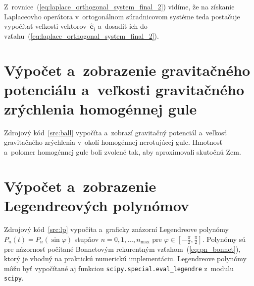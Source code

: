 \documentclass[a4paper, 12pt]{book}
\let\vec\mathbf
\begin{document}
Z~rovnice~(\ref{eq:laplace_orthogonal_system_final_2}) vidíme, že na získanie 
Laplaceovho operátora v~ortogonálnom súradnicovom systéme teda postačuje 
vypočítať veľkosti vektorov~$\hat{\vec e}_i$ a~dosadiť ich do 
vzťahu~(\ref{eq:laplace_orthogonal_system_final_2}).




\chapter{Výpočet a~zobrazenie gravitačného potenciálu a~veľkosti gravitačného 
zrýchlenia homogénnej gule}
\label{app:ball}

Zdrojový kód~\ref{src:ball} vypočíta a~zobrazí gravitačný potenciál a~veľkosť 
gravitačného zrýchlenia v~okolí homogénnej nerotujúcej gule.  Hmotnosť 
a~polomer homogénnej gule boli zvolené tak, aby aproximovali skutočnú Zem.

\vspace{2ex}






\chapter{Výpočet a~zobrazenie Legendreových polynómov}
\label{app:lp}

Zdrojový kód~\ref{src:lp} vypočíta a~graficky znázorní Legendreove polynómy 
$P_n(t) = P_n(\sin\varphi)$ stupňov $n = 0, 1, \dots, n_{\max}$ pre $\varphi 
\in [-\frac{\pi}{2}, \frac{\pi}{2}]$.  Polynómy sú pre názornosť počítané 
Bonnetovým rekurentným vzťahom~(\ref{eq:pn_bonnet}), ktorý je vhodný na 
praktickú numerickú implementáciu.  Legendreove polynómy môžu byť vypočítané aj 
funkciou \texttt{scipy.special.eval\_legendre} z~modulu \texttt{scipy}.

\vspace{4ex}


\end{document}
